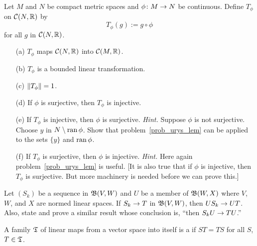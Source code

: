\begin{prob}\label{prob_c_functor}  Let $M$ and $N$ be compact metric spaces and
$\phi\colon M \rightarrow N$ be continuous.  Define $T_\phi$ on $\mathcal{C}(N,\mathbb{R})$ by
  \[ T_\phi(g) := g \circ \phi \]
for all $g$ in $\mathcal{C}(N,\mathbb{R})$.
 \begin{enumerate}
  \item[(a)] $T_\phi$ maps $\mathcal{C}(N,\mathbb{R})$ into $\mathcal{C}(M,\mathbb{R})$.
  \item[(b)] $T_\phi$ is a bounded linear transformation.
  \item[(c)] $\lVert T_\phi\rVert = 1$.
  \item[(d)] If $\phi$ is surjective, then $T_\phi$ is injective.
  \item[(e)] If $T_\phi$ is injective, then $\phi$ is surjective.
\emph{Hint.}  Suppose $\phi$ is not surjective.  Choose $y$ in $N \setminus \operatorname{ran}\phi$.  Show
that problem~\ref{prob_urys_lem} can be applied to the sets $\{y\}$ and $\operatorname{ran}\phi$.
  \item[(f)] If $T_\phi$ is surjective, then $\phi$ is injective.  \emph{Hint.}  Here again
problem~\ref{prob_urys_lem} is useful. [It is also true that if $\phi$ is injective, then
$T_\phi$ is surjective.  But more machinery is needed before we can prove this.]
 \end{enumerate}
\end{prob}

\begin{prob}  Let $(S_k)$ be a sequence in $\mathfrak{B}(V,W)$ and $U$ be a member of $\mathfrak{B}(W,X)$
where $V$, $W$, and $X$ are normed linear spaces.  If $S_k \rightarrow T$ in $\mathfrak{B}(V,W)$, then
$US_k \rightarrow UT$.  Also, state and prove a similar result whose conclusion is, ``then $S_kU \rightarrow
TU$.''
\end{prob}

\begin{defn} A family $\mathfrak{T}$ of linear maps from a vector space into itself is a
 if $ST = TS$ for all $S$, $T \in \mathfrak{T}$.
\end{defn}


